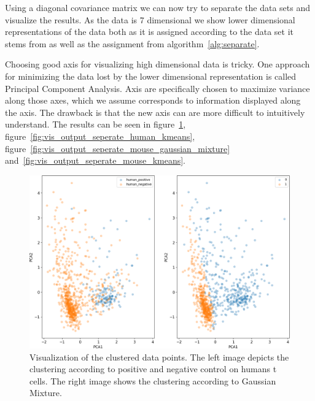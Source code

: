 Using a diagonal covariance matrix we can now try to separate the data sets and visualize the results. As the data is 7 dimensional we show lower dimensional representations of the data both as it is assigned according to the data set it stems from as well as the assignment from algorithm~\ref{alg:separate}.

Choosing good axis for visualizing high dimensional data is tricky. One approach for minimizing the data lost by the lower dimensional representation is called Principal Component Analysis. Axis are specifically chosen to maximize variance along those axes, which we assume corresponds to information displayed along the axis. The drawback is that the new axis can are more difficult to intuitively understand. The results can be seen in figure~\ref{fig:vis_output_seperate_human_gaussian_mixture}, figure~\ref{fig:vis_output_seperate_human_kmeans}, figure~\ref{fig:vis_output_seperate_mouse_gaussian_mixture} and~\ref{fig:vis_output_seperate_mouse_kmeans}.

\begin{figure}
	\centering
	\includegraphics[width=\textwidth]{fig/separate_human_gaussian_mixture}
	
	\caption{Visualization of the clustered data points. The left image depicts the clustering according to positive and negative control on humans t cells. The right image shows the clustering according to Gaussian Mixture.}
	\label{fig:vis_output_seperate_human_gaussian_mixture}
\end{figure}
	
